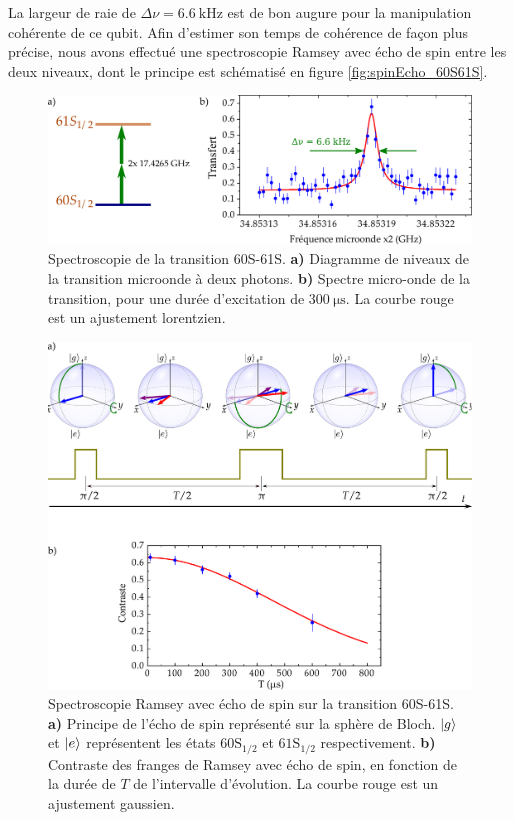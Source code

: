 La largeur de raie de $\Delta\nu=\SI{6.6}{\kHz}$ est de bon augure pour la manipulation cohérente de ce qubit.
Afin d'estimer son temps de cohérence de façon plus précise, nous avons effectué une spectroscopie Ramsey avec écho de spin entre les deux niveaux, dont le principe est schématisé en figure \eqref{fig:spinEcho_60S61S}.

\begin{figure}[h]
\centering
\vspace{1em}
\includegraphics[width=.8\linewidth]{figures/setup/rydberg/spectro_60S61S}
\caption[Spectroscopie de la transition 60S-61S]{
Spectroscopie de la transition 60S-61S.
\textbf{a)} Diagramme de niveaux de la transition microonde à deux photons.
\textbf{b)} Spectre micro-onde de la transition, pour une durée d'excitation de $\SI{300}{\us}$. La courbe rouge est un ajustement lorentzien.
}
\label{fig:spectro_60S61S}
\end{figure}

\begin{figure}[!h]
\centering
\vspace{1em}
\includegraphics[width=.8\linewidth]{figures/setup/rydberg/spinEcho_60S61S}
\caption[Écho de spin 60S-61S]{
Spectroscopie Ramsey avec écho de spin sur la transition 60S-61S.
\textbf{a)} Principe de l'écho de spin représenté sur la sphère de Bloch. $\ket{g}$ et $\ket{e}$ représentent les états $\mathrm{60S_{1/2}}$ et $\mathrm{61S_{1/2}}$ respectivement.
\textbf{b)} Contraste des franges de Ramsey avec écho de spin, en fonction de la durée de $T$ de l'intervalle d'évolution. La courbe rouge est un ajustement gaussien.
}
\label{fig:spinEcho_60S61S}
\end{figure}

